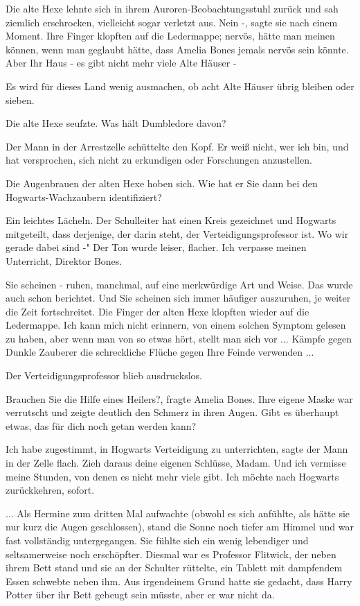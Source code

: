 Die alte Hexe lehnte sich in ihrem Auroren-Beobachtungsstuhl zurück und sah
ziemlich erschrocken, vielleicht sogar verletzt aus. \glqq Nein -\grqq{}, sagte
sie nach einem Moment. Ihre Finger klopften auf die Ledermappe; nervös, hätte
man meinen können, wenn man geglaubt hätte, dass Amelia Bones jemals nervös sein
könnte. \glqq Aber Ihr Haus - es gibt nicht mehr viele Alte Häuser -\grqq{}

\glqq Es wird für dieses Land wenig ausmachen, ob acht Alte Häuser übrig bleiben
oder sieben.\grqq{}

Die alte Hexe seufzte. \glqq Was hält Dumbledore davon?\grqq{}

Der Mann in der Arrestzelle schüttelte den Kopf. \glqq Er weiß nicht, wer ich
bin, und hat versprochen, sich nicht zu erkundigen oder Forschungen
anzustellen.\grqq{}

Die Augenbrauen der alten Hexe hoben sich. \glqq Wie hat er Sie dann bei den
Hogwarts-Wachzaubern identifiziert?\grqq{}

Ein leichtes Lächeln. \glqq Der Schulleiter hat einen Kreis gezeichnet und
Hogwarts mitgeteilt, dass derjenige, der darin steht, der Verteidigungsprofessor
ist. Wo wir gerade dabei sind -" Der Ton wurde leiser, flacher. \glqq Ich
verpasse meinen Unterricht, Direktor Bones.\grqq{}

\glqq Sie scheinen - ruhen, manchmal, auf eine merkwürdige Art und Weise. Das
wurde auch schon berichtet. Und Sie scheinen sich immer häufiger auszuruhen, je
weiter die Zeit fortschreitet.\grqq{} Die Finger der alten Hexe klopften wieder
auf die Ledermappe. \glqq Ich kann mich nicht erinnern, von einem solchen
Symptom gelesen zu haben, aber wenn man von so etwas hört, stellt man sich vor
... Kämpfe gegen Dunkle Zauberer die schreckliche Flüche gegen Ihre Feinde
verwenden ...\grqq{}

Der Verteidigungsprofessor blieb ausdruckslos.

\glqq Brauchen Sie die Hilfe eines Heilers?\grqq{}, fragte Amelia Bones. Ihre
eigene Maske war verrutscht und zeigte deutlich den Schmerz in ihren Augen.
\glqq Gibt es überhaupt etwas, das für dich noch getan werden kann?\grqq{}

\glqq Ich habe zugestimmt, in Hogwarts Verteidigung zu unterrichten\grqq{},
sagte der Mann in der Zelle flach. \glqq Zieh daraus deine eigenen Schlüsse,
Madam. Und ich vermisse meine Stunden, von denen es nicht mehr viele gibt. Ich
möchte nach Hogwarts zurückkehren, sofort.\grqq{}

... Als Hermine zum dritten Mal aufwachte (obwohl es sich anfühlte, als hätte
sie nur kurz die Augen geschlossen), stand die Sonne noch tiefer am Himmel und
war fast vollständig untergegangen. Sie fühlte sich ein wenig lebendiger und
seltsamerweise noch erschöpfter. Diesmal war es Professor Flitwick, der neben
ihrem Bett stand und sie an der Schulter rüttelte, ein Tablett mit dampfendem
Essen schwebte neben ihm. Aus irgendeinem Grund hatte sie gedacht, dass Harry
Potter über ihr Bett gebeugt sein müsste, aber er war nicht da.

